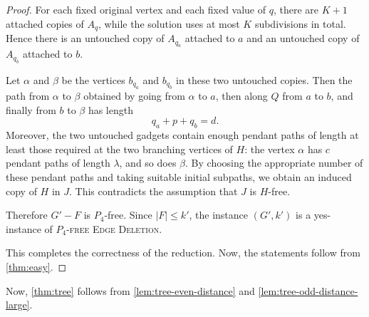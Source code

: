 \documentclass[a4paper,UKenglish,cleveref, autoref, thm-restate]{lipics-v2021}
\begin{document}
\begin{proof}
For each fixed original vertex and each fixed value of $q$, there are $K+1$
attached copies of $A_q$, while the solution uses at most $K$ subdivisions in
total.  Hence there is an untouched copy of $A_{q_a}$ attached to $a$ and an
untouched copy of $A_{q_b}$ attached to $b$.

Let $\alpha$ and $\beta$ be the vertices $b_{q_a}$ and $b_{q_b}$ in these two
untouched copies.  Then the path from $\alpha$ to $\beta$ obtained by going
from $\alpha$ to $a$, then along $Q$ from $a$ to $b$, and finally from $b$ to
$\beta$ has length
\[
    q_a+p+q_b=d.
\]
Moreover, the two untouched gadgets contain enough pendant paths of length at
least those required at the two branching vertices of $H$: the vertex
$\alpha$ has $c$ pendant paths of length $\lambda$, and so does $\beta$.
By choosing the appropriate number of these pendant paths and taking suitable
initial subpaths, we obtain an induced copy of $H$ in $J$.  This contradicts
the assumption that $J$ is $H$-free.

Therefore $G'-F$ is $P_4$-free.  Since $|F|\leq k'$, the instance $(G',k')$ is
a yes-instance of \textsc{$P_4$-free Edge Deletion}.

This completes the correctness of the reduction. Now, the statements follow from \cref{thm:easy}.
\end{proof}

Now, \cref{thm:tree} follows from \cref{lem:tree-even-distance} and \cref{lem:tree-odd-distance-large}.






\appendix


\end{document}
